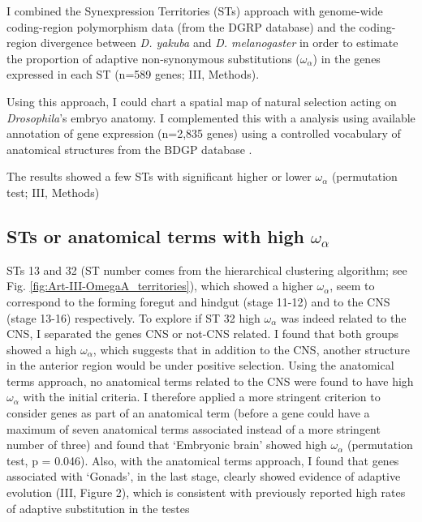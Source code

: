 
I combined the Synexpression Territories (STs) approach with genome-wide coding-region polymorphism data (from the DGRP database) and the coding-region divergence between \textit{D. yakuba} and \textit{D. melanogaster} in order to estimate the  proportion of adaptive non-synonymous substitutions ($\omega_{\alpha}$) in the genes expressed in each ST (n=589 genes; III, Methods).
	

Using this approach, I could chart a spatial map of natural selection acting on \textit{Drosophila}'s embryo anatomy.
I complemented this with a analysis using available annotation of gene expression (n=2,835 genes) using a controlled vocabulary of anatomical structures from the BDGP database \citep{Tomancak2007}.

The results showed a few STs with significant higher or lower $\omega_{\alpha}$ (permutation test; III, Methods)

\subsection{STs or anatomical terms with high {\large$\omega_{\alpha}$}}
STs 13 and 32 (ST number comes from the hierarchical clustering algorithm; see Fig. \ref{fig:Art-III-OmegaA_territories}), which showed a higher $\omega_{\alpha}$, seem to correspond to the forming foregut and hindgut (stage 11-12) and to the CNS (stage 13-16) respectively.
To explore if ST 32 high $\omega_{\alpha}$ was indeed related to the CNS, I separated the genes CNS or not-CNS related.
I found that both groups showed a high $\omega_{\alpha}$, which suggests that in addition to the CNS, another structure in the anterior region would be under positive selection.
Using the anatomical terms approach, no anatomical terms related to the CNS were found to have high $\omega_{\alpha}$ with the initial criteria.
I therefore applied a more stringent criterion to consider genes as part of an anatomical term (before a gene could have a maximum of seven anatomical terms associated instead of a more stringent number of three) and found that `Embryonic brain' showed high $\omega_{\alpha}$ (permutation test, p = 0.046).
Also, with the anatomical terms approach, I found that genes associated with `Gonads', in the last stage, clearly showed evidence of adaptive evolution (III, Figure 2), which is consistent with previously reported high rates of adaptive substitution in the testes \citep{Akashi1994,Civetta1995,Nuzhdin2004,Proschel2006}


